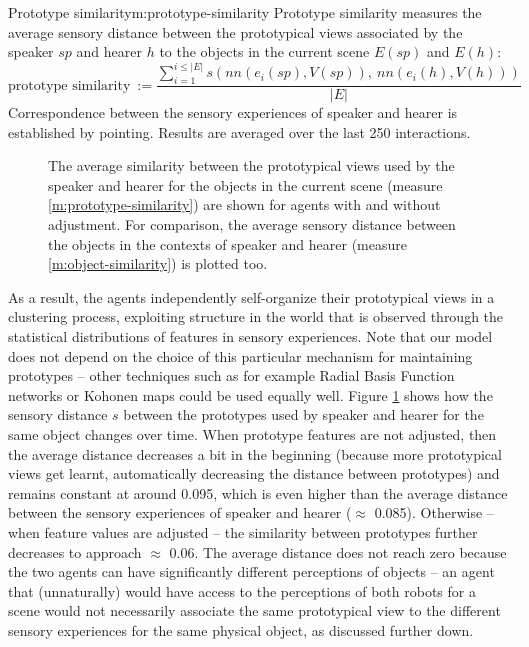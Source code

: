 \begin{measure}[b]{Prototype similarity}{m:prototype-similarity}
  Prototype similarity measures the average sensory distance between
  the prototypical views associated by the speaker $sp$ and hearer $h$
  to the objects in the current scene $E(sp)$ and $E(h)$:
  $$\text{prototype similarity}
  ~:=\frac{\sum_{i=1}^{i\leq|E|}s\left(nn\left(e_i(sp),V(sp)\right),\
      nn\left(e_i(h),V(h)\right)\right)}{|E|}$$ Correspondence between
  the sensory experiences of speaker and hearer is established by
  pointing. Results are averaged over the last 250 interactions.
\end{measure}

\begin{figure}[t]
  \caption{The average similarity between the prototypical views used
    by the speaker and hearer for the objects in the current scene
    (measure \ref{m:prototype-similarity}) are shown for agents with
    and without adjustment. For comparison, the average sensory
    distance between the objects in the contexts of speaker and hearer
    (measure \ref{m:object-similarity}) is plotted too. }
  \label{f:gng-prototype-similarity}
\end{figure}

As a result, the agents independently self-organize their prototypical
views in a clustering process, exploiting structure in the world
\citep{rosch76basic} that is observed through the statistical
distributions of features in sensory experiences. Note that our model
does not depend on the choice of this particular mechanism for
maintaining prototypes -- other techniques such as for example Radial
Basis Function networks \citep{poggio90networks} or Kohonen maps
\citep{kohonen82self-organized} could be used equally well. Figure
\ref{f:gng-prototype-similarity} shows how the sensory distance $s$
between the prototypes used by speaker and hearer for the same object
changes over time. When prototype features are not adjusted, then the
average distance decreases a bit in the beginning (because more
prototypical views get learnt, automatically decreasing the distance
between prototypes) and remains constant at around 0.095, which is
even higher than the average distance between the sensory experiences
of speaker and hearer ($\approx$ 0.085). Otherwise -- when feature
values are adjusted -- the similarity between prototypes further
decreases to approach $\approx$ 0.06. The average distance does not
reach zero because the two agents can have significantly different
perceptions of objects -- an agent that (unnaturally) would have
access to the perceptions of both robots for a scene would not
necessarily associate the same prototypical view to the different
sensory experiences for the same physical object, as discussed further
down.


